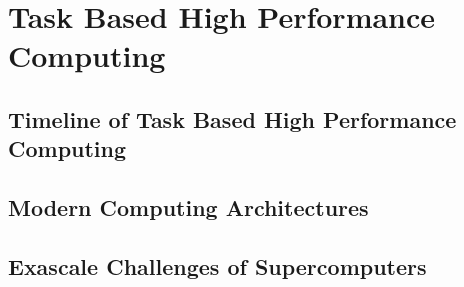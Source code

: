 \chapter{Task Based High Performance Computing}

\section{Timeline of Task Based High Performance Computing}

\section{Modern Computing Architectures}

\section{Exascale Challenges of Supercomputers}
